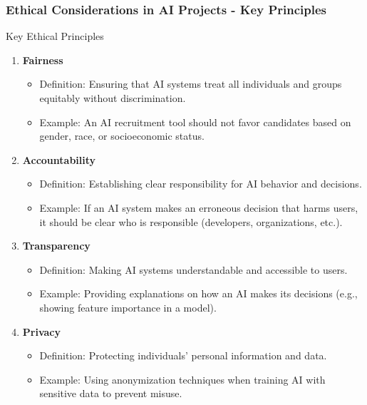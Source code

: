 \documentclass{beamer}
\begin{document}
\begin{frame}[fragile]
    \frametitle{Ethical Considerations in AI Projects - Key Principles}
    \begin{block}{Key Ethical Principles}
        \begin{enumerate}
            \item \textbf{Fairness}
                \begin{itemize}
                    \item Definition: Ensuring that AI systems treat all individuals and groups equitably without discrimination.
                    \item Example: An AI recruitment tool should not favor candidates based on gender, race, or socioeconomic status.
                \end{itemize}
                
            \item \textbf{Accountability}
                \begin{itemize}
                    \item Definition: Establishing clear responsibility for AI behavior and decisions.
                    \item Example: If an AI system makes an erroneous decision that harms users, it should be clear who is responsible (developers, organizations, etc.).
                \end{itemize}
                
            \item \textbf{Transparency}
                \begin{itemize}
                    \item Definition: Making AI systems understandable and accessible to users.
                    \item Example: Providing explanations on how an AI makes its decisions (e.g., showing feature importance in a model).
                \end{itemize}
                
            \item \textbf{Privacy}
                \begin{itemize}
                    \item Definition: Protecting individuals' personal information and data.
                    \item Example: Using anonymization techniques when training AI with sensitive data to prevent misuse.
                \end{itemize}
                

\end{enumerate}
\end{block}
\end{frame}
\end{document}
